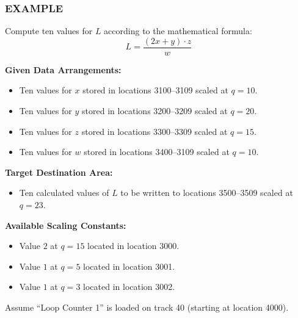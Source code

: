 \subsubsection*{EXAMPLE}
Compute ten values for $L$ according to the mathematical formula:
$$L = \frac{(2x + y) \cdot z}{w}$$

\textbf{Given Data Arrangements:}
\begin{itemize}
    \item Ten values for $x$ stored in locations 3100--3109 scaled at $q = 10$.
\item Ten values for $y$ stored in locations 3200--3209 scaled at $q = 20$.
\item Ten values for $z$ stored in locations 3300--3309 scaled at $q = 15$.
\item Ten values for $w$ stored in locations 3400--3109 scaled at $q = 10$.
\end{itemize}

\textbf{Target Destination Area:}
\begin{itemize}
    \item Ten calculated values of $L$ to be written to locations 3500--3509 scaled at $q = 23$.
\end{itemize}

\textbf{Available Scaling Constants:}
\begin{itemize}
    \item Value $2$ at $q = 15$ located in location 3000.
    \item Value $1$ at $q = 5$ located in location 3001.
    \item Value $1$ at $q = 3$ located in location 3002.
\end{itemize}
Assume ``Loop Counter 1'' is loaded on track 40 (starting at location 4000).

\newpage


